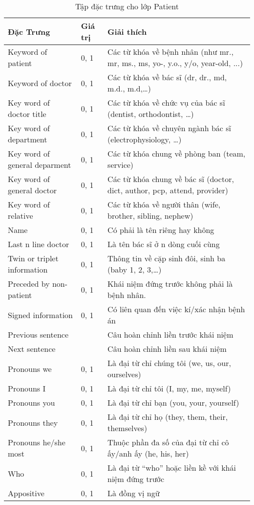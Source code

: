 \begin{table}[th]
\centering{}
\caption{Tập đặc trưng cho lớp Patient \label{tab:PatientFeatures}}
\footnotesize\sffamily

\begin{tabularx}{\textwidth}{@{}P{\raggedright}{0.3}lL@{}}
\toprule 
\textbf{Đặc Trưng} & \textbf{Giá trị} & \textbf{Giải thích}\\
\midrule
Keyword of patient & 0, 1 & Các từ khóa về bệnh nhân (như mr., mr, ms., ms, yo-, y.o., y/o, year-old, ...)\\
Keyword of doctor & 0, 1 & Các từ khóa về bác sĩ (dr, dr., md, m.d., m.d,…)\\
Key word of doctor title & 0, 1 & Các từ khóa về chức vụ của bác sĩ (dentist, orthodontist, …)\\
Key word of department  & 0, 1 & Các từ khóa về chuyên ngành bác sĩ (electrophysiology, …)\\
Key word of general deparment & 0, 1 & Các từ khóa chung về phòng ban (team, service)\\
Key word of general doctor & 0, 1 & Các từ khóa chung về bác sĩ (doctor, dict, author, pcp, attend, provider)\\
Key word of relative & 0, 1 & Các từ khóa về người thân (wife, brother, sibling, nephew)\\
Name & 0, 1 & Có phải là tên riêng hay không\\
Last n line doctor & 0, 1 & Là tên bác sĩ ở n dòng cuối cùng\\
Twin or triplet information & 0, 1 & Thông tin về cặp sinh đôi, sinh ba (baby 1, 2, 3,…)\\
Preceded by non-patient & 0, 1 & Khái niệm đứng trước không phải là bệnh nhân.\\
Signed information  & 0, 1 & Có liên quan đến việc kí/xác nhận bệnh án\\
Previous sentence &  & Câu hoàn chỉnh liền trước khái niệm\\
Next sentence &  & Câu hoàn chỉnh liền sau khái niệm\\
Pronouns we & 0, 1 & Là đại từ chỉ chúng tôi (we, us, our, ourselves)\\
Pronouns I & 0, 1 & Là đại từ chỉ tôi (I, my, me, myself)\\
Pronouns you & 0, 1 & Là đại từ chỉ bạn (you, your, yourself)\\
Pronouns they & 0, 1 & Là đại từ chỉ họ (they, them, their, themselves)\\
Pronouns he/she most & 0, 1 & Thuộc phần đa số của đại từ chỉ cô ấy/anh ấy (he, his, her)\\
Who & 0, 1 & Là đại từ “who” hoặc liền kề với khái niệm đứng trước\\
Appositive & 0, 1 & Là đồng vị ngữ\\
\bottomrule
\end{tabularx}
\end{table}

